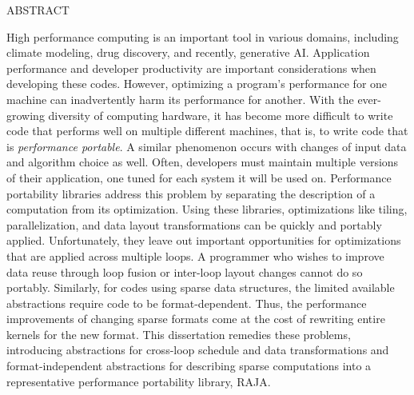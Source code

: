 \pagebreak

\addchaptertocentry{\abstractname} %

\begin{center}
\MakeUppercase{Abstract}\\ \bigskip
\end{center}


High performance computing is an important tool in various domains, including climate modeling, drug discovery, and recently, generative AI\@.
Application performance and developer productivity are important considerations when developing these codes.
However, optimizing a program's performance for one machine can inadvertently harm its performance for another.
With the ever-growing diversity of computing hardware, it has become more difficult to write code that performs well on multiple different machines, that is, to write code that is \textit{performance portable}.
A similar phenomenon occurs with changes of input data and algorithm choice as well.
Often, developers must maintain multiple versions of their application, one tuned for each system it will be used on.
Performance portability libraries address this problem by separating the description of a computation from its optimization.
Using these libraries, optimizations like tiling, parallelization, and data layout transformations can be quickly and portably applied.
Unfortunately, they leave out important opportunities for optimizations that are applied across multiple loops.
A programmer who wishes to improve data reuse through loop fusion or inter-loop layout changes cannot do so portably.
Similarly, for codes using sparse data structures, the limited available abstractions require code to be format-dependent.
Thus, the performance improvements of changing sparse formats come at the cost of rewriting entire kernels for the new format.
This dissertation remedies these problems, introducing abstractions for cross-loop schedule and data transformations and format-independent abstractions for describing sparse computations into a representative performance portability library, RAJA\@.

